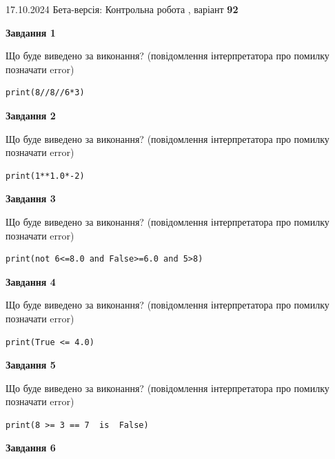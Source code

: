 \documentclass[12pt, ukrainian]{article}
\begin{document}
{\Large{17.10.2024 Бета-версія: Контрольна робота , варіант  \No \textbf { 92 }\par}}
{
\begin {large}
{\begin {center}\textbf{Завдання 1}\end {center}}

Що буде виведено за виконання? (повідомлення інтерпретатора про помилку позначати error)\par
\begin{verbatim}
print(8//8//6*3)
\end{verbatim}

{\begin {center}\textbf{Завдання 2}\end {center}}

Що буде виведено за виконання? (повідомлення інтерпретатора про помилку позначати error)\par
\begin{verbatim}
print(1**1.0*-2)
\end{verbatim}

{\begin {center}\textbf{Завдання 3}\end {center}}

Що буде виведено за виконання? (повідомлення інтерпретатора про помилку позначати error)\par
\begin{verbatim}
print(not 6<=8.0 and False>=6.0 and 5>8)
\end{verbatim}

{\begin {center}\textbf{Завдання 4}\end {center}}

Що буде виведено за виконання? (повідомлення інтерпретатора про помилку позначати error)\par
\begin{verbatim}
print(True <= 4.0)
\end{verbatim}

{\begin {center}\textbf{Завдання 5}\end {center}}

Що буде виведено за виконання? (повідомлення інтерпретатора про помилку позначати error)\par
\begin{verbatim}
print(8 >= 3 == 7  is  False)
\end{verbatim}

{\begin {center}\textbf{Завдання 6}\end {center}}


\end{large}}
\end{document}
